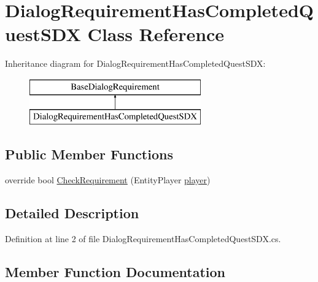 \hypertarget{class_dialog_requirement_has_completed_quest_s_d_x}{}\section{Dialog\+Requirement\+Has\+Completed\+Quest\+S\+DX Class Reference}
\label{class_dialog_requirement_has_completed_quest_s_d_x}
Inheritance diagram for Dialog\+Requirement\+Has\+Completed\+Quest\+S\+DX\+:\begin{figure}[H]
\begin{center}
\leavevmode
\includegraphics[height=2.000000cm]{df/d8f/class_dialog_requirement_has_completed_quest_s_d_x}
\end{center}
\end{figure}
\subsection*{Public Member Functions}
\begin{DoxyCompactItemize}
\item 
override bool \mbox{\hyperlink{class_dialog_requirement_has_completed_quest_s_d_x_ad56a73dc295421e4c6ba3cdb0cccfa67}{Check\+Requirement}} (Entity\+Player \mbox{\hyperlink{_sphere_i_i_01_music_01_boxes_2_config_2_localization_8txt_a4e2cb8aeff651600ea1cc57fe5a929a4}{player}})
\end{DoxyCompactItemize}


\subsection{Detailed Description}


Definition at line 2 of file Dialog\+Requirement\+Has\+Completed\+Quest\+S\+D\+X.\+cs.



\subsection{Member Function Documentation}
\mbox{\label{class_dialog_requirement_has_completed_quest_s_d_x_ad56a73dc295421e4c6ba3cdb0cccfa67}} 

